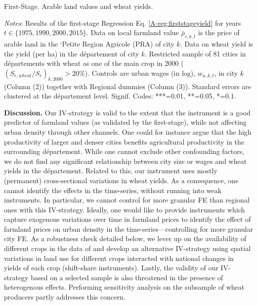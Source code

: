 \documentclass[11pt]{report}
\newcommand{\datatables}{../../output/data/tables}
\begin{document}
\begin{table}[h!]
	\begin{center}
	
		\caption{First-Stage. Arable land values and wheat yields.\label{A-tab:1SLSyield}}
	\end{center}
	{\footnotesize \textit{Notes}: Results of the first-stage Regression Eq. \ref{A-reg:firststageyield} for years $t \in \{1975, 1990, 2000, 2015\}$. Data on local farmland value $\bar{\rho}_{r,k,t}$ is the price of arable land in the `Petite Region Agricole (PRA) of city $k$.  Data on wheat yield is the yield (per ha) in the département of city $k$. Restricted sample of 81 cities in départements with wheat as one of the main crop in 2000 ($(S_{r,wheat}/S_r)_{k,2000}>20\%$). Controls are urban wages (in log), $w_{u,k,t}$, in city $k$ (Column (2)) together with Regional dummies (Column (3)). Standard errors are clustered at the département level. Signif. Codes: ***=0.01, **=0.05, *=0.1.}
\end{table}

\noindent \textbf{Discussion.} Our IV-strategy is valid to the extent that the instrument is a good predictor of farmland values (as validated by the first-stage), while not affecting urban density through other channels. One could for instance argue that the high productivity of larger and denser cities benefits agricultural productivity in the surrounding département. While one cannot exclude other confounding factors, we do not find any significant relationship between city size or wages and wheat yields in the département. Related to this, our instrument uses mostly (permanent) cross-sectional variations in wheat yields. As a consequence, one cannot identify the effects in the time-series, without running into weak instruments. In particular, we cannot control for more granular FE than regional ones  with this IV-strategy. Ideally, one would like to provide instruments which capture exogenous variations over time in farmland prices to identify the effect of farmland prices on urban density in the time-series---controlling for more granular city FE. As a robustness check detailed below, we lever up on the availability of different crops in the data of \cite{schaubergeretal2022} and develop an alternative IV-strategy using spatial variations in land use for different crops interacted with national changes in yields of each crop (shift-share instruments). Lastly, the validity of our IV-strategy based on a selected sample is also threatened in the presence of heterogenous effects. Performing sensitivity analysis on the subsample of wheat producers partly addresses this concern. 
\end{document}
